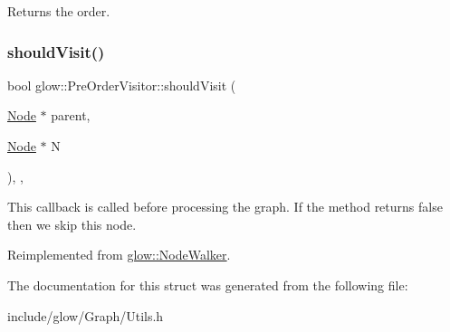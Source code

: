 \begin{DoxyReturn}{Returns}
the order. 
\end{DoxyReturn}
\mbox{\label{structglow_1_1_pre_order_visitor_ac8c137afc60efc698bfcaca489b073db}} 
\subsubsection{\texorpdfstring{should\+Visit()}{shouldVisit()}}
{\footnotesize\ttfamily bool glow\+::\+Pre\+Order\+Visitor\+::should\+Visit (\begin{DoxyParamCaption}\item[{\hyperlink{classglow_1_1_node}{Node} $\ast$}]{parent,  }\item[{\hyperlink{classglow_1_1_node}{Node} $\ast$}]{N }\end{DoxyParamCaption})\hspace{0.3cm}{\ttfamily [inline]}, {\ttfamily [override]}, {\ttfamily [virtual]}}

This callback is called before processing the graph. If the method returns false then we skip this node. 

Reimplemented from \hyperlink{classglow_1_1_node_walker_a33532d7a4fe24f71c1b763c53182b20b}{glow\+::\+Node\+Walker}.



The documentation for this struct was generated from the following file\+:\begin{DoxyCompactItemize}
\item 
include/glow/\+Graph/Utils.\+h\end{DoxyCompactItemize}
